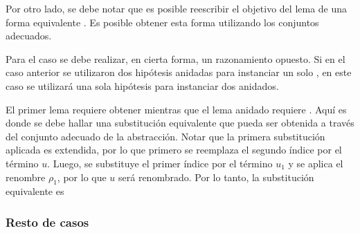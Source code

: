 Por otro lado, se debe notar que es posible reescribir el objetivo del lema de una forma equivalente
\subst
{}
{}
. Es posible obtener esta forma utilizando los conjuntos adecuados.


Para el caso  se debe realizar, en cierta forma, un razonamiento opuesto.
Si en el caso anterior se utilizaron dos hipótesis anidadas para instanciar un solo , en este caso se utilizará una sola hipótesis para instanciar dos  anidados.

El primer lema requiere obtener
\subst
{ }
{}
mientras que el lema anidado requiere
\subst
{}
{}
. Aquí es donde se debe hallar una substitución equivalente que pueda ser obtenida a través del conjunto adecuado de la abstracción.
Notar que la primera substitución aplicada es extendida, por lo que primero se reemplaza el segundo índice por el término $u$.
Luego, se substituye el primer índice por el término $u_1$ y se aplica el renombre $\rho_1$, por lo que $u$ será renombrado.
Por lo tanto, la substitución equivalente es



\subsubsection{Resto de casos}


